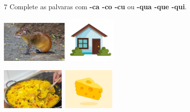 
\num{7} Complete as palvaras com \textbf{-ca -co -cu} ou \textbf{-qua -que -qui}.


\includegraphics[width=1.30278in,height=0.81667in]{media/image26.jpeg}
\includegraphics[width=1.00903in,height=0.90972in]{media/image27.jpeg}

\includegraphics[width=1.24028in,height=0.81042in]{media/image28.jpeg}
\includegraphics[width=1.05556in,height=0.81667in]{media/image29.jpeg}

